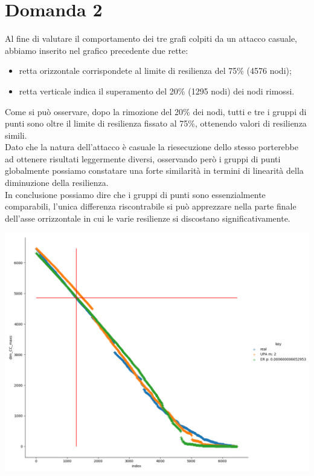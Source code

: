 \documentclass{article}
\begin{document}
\newpage
\section*{Domanda 2}
Al fine di valutare il comportamento dei tre grafi colpiti da un attacco casuale, abbiamo inserito nel grafico precedente due rette:
\begin{itemize}
	\item retta orizzontale corrispondete al limite di resilienza del 75\% (4576 nodi);
	\item retta verticale indica il superamento del 20\% (1295 nodi) dei nodi rimossi. 
\end{itemize}
Come si può osservare, dopo la rimozione del 20\% dei nodi, tutti e tre i gruppi di punti sono oltre il limite di resilienza fissato al 75\%, ottenendo valori di resilienza simili.\\
Dato che la natura dell'attacco è casuale la riesecuzione dello stesso porterebbe ad ottenere risultati leggermente diversi, osservando però i gruppi di punti globalmente possiamo constatare una forte similarità in termini di linearità della diminuzione della resilienza.\\
In conclusione possiamo dire che i gruppi di punti sono essenzialmente comparabili, l'unica differenza riscontrabile si può apprezzare nella parte finale dell'asse orrizzontale in cui le varie resilienze si discostano significativamente.

\includegraphics[width=1.0\textwidth]{../grafici/Figure_2}
\end{document}
